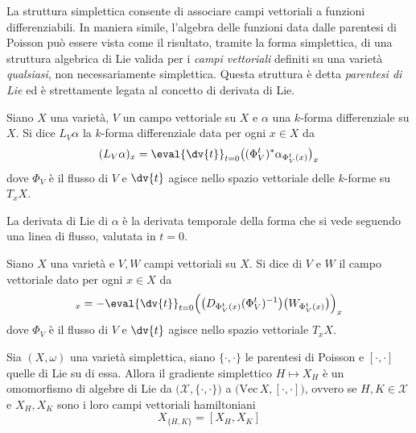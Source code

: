La struttura simplettica consente di associare campi vettoriali a funzioni differenziabili. In maniera simile, l'algebra delle funzioni data dalle parentesi di Poisson può essere vista come il risultato, tramite la forma simplettica, di una struttura algebrica di Lie valida per i \emph{campi vettoriali} definiti su una varietà \emph{qualsiasi}, non necessariamente simplettica. Questa struttura è detta \emph{parentesi di Lie} ed è strettamente legata al concetto di derivata di Lie.
\begin{definition}
  Siano $X$ una varietà, $V$ un campo vettoriale su $X$ e $\alpha$ una $k$-forma differenziale su $X$. Si dice  $L_V\alpha$ la $k$-forma differenziale data per ogni $x \in X$ da \begin{equation*}
  (L_V \alpha)_x = \eval{\dv{t}}_{t=0} \big( (\Phi_V^t)^* \alpha_{\Phi_V^t(x)}\big)_x
  \end{equation*} 
  dove $\Phi_V$ è il flusso di $V$ e $\dv{t}$ agisce nello spazio vettoriale delle $k$-forme su $T_x X$.
\end{definition}
\begin{remark}
  La derivata di Lie di $\alpha$ è la derivata temporale della forma che si vede seguendo una linea di flusso, valutata in $t=0$.
\end{remark}
\begin{definition}
  Siano $X$ una varietà e $V,W$ campi vettoriali su $X$. Si dice  di $V$ e $W$ il campo vettoriale dato per ogni $x \in X$ da \begin{equation*}
  [V,W]_x = - \eval{\dv{t}}_{t=0} \Big(\big(D_{\Phi_V^t(x)} (\Phi_V^t)^{-1}\big)\big(W_{\Phi_V^t(x)}\big) \Big)_x
  \end{equation*}
  dove $\Phi_V$ è il flusso di $V$ e $\dv{t}$ agisce nello spazio vettoriale $T_x X$.
\end{definition}
\begin{theorem}
  Sia $(X, \omega)$ una varietà simplettica, siano $\{\cdot , \cdot \}$ le parentesi di Poisson e $[\cdot , \cdot ]$ quelle di Lie su di essa. Allora il gradiente simplettico $H \mapsto X_H$ è un omomorfismo di algebre di Lie da $\big(\mathcal{X}, \{\cdot , \cdot \} \big)$ a $\big(\mathrm{Vec}\, X, [\cdot , \cdot]\big)$, ovvero se $H,K \in \mathcal{X}$ e $X_H, X_K$ sono i loro campi vettoriali hamiltoniani \begin{equation*}
  X_{\{H,K\}} = [X_H, X_K]
  \end{equation*} 
\end{theorem}

